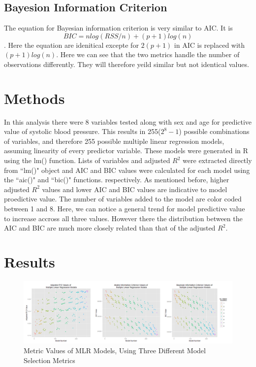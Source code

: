 \documentclass{article}\usepackage[]{graphicx}\usepackage[]{color}
\begin{document}
 \subsection{Bayesion Information Criterion}
 The equation for Bayesian information criterion is very similar to AIC. It is $$ BIC=nlog(RSS/n)+(p+1)log(n) $$.  Here the equation are idenitical excepte for $2(p+1)$ in AIC is replaced with $(p+1)log(n)$.  Here we can see that the two metrics handle the number of observations differently.  They will therefore yeild similar but not identical values.
 
\section{Methods}
In this analysis there were 8 variables tested along with sex and age for predictive value of systolic blood pressure.  This results in 255($2^8-1$) possible combinations of variables, and therefore 255 possible multiple linear regression models, assuming linearity of every predictor variable.  These models were generated in R using the lm() function.  Lists of variables and adjusted $R^2$ were extracted directly from ``lm()" object and AIC and BIC values were calculated for each model using the ``aic()" and ``bic()" functions. respectively. As mentioned before, higher adjusted $R^2$ values and lower AIC and BIC values are indicative to model proedictive value.  The number of variables added to the model are color coded between 1 and 8.  Here, we can notice a general trend for model predictive value to increase accross all three values. However there the distribution between the AIC and BIC are much more closely related than that of the adjusted $R^2$.

\section{Results}

\begin{figure}[h]
\begin{center}
    \centering
    \includegraphics[width=1\textwidth]{3crits.png}
    \caption{Metric Values of MLR Models, Using Three Different  Model Selection Metrics}
    \label{fig:awesome_image}
\end{center}
\end{figure}
  
\end{document}

